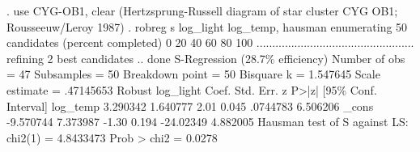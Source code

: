 . use CYG-OB1, clear
(Hertzsprung-Russell diagram of star cluster CYG OB1; Rousseeuw/Leroy 1987)
{\smallskip}
. robreg s log_light log_temp, hausman
{\smallskip}
enumerating 50 candidates (percent completed)
0  20  40  60  80  100
..................................................
{\smallskip}
refining 2 best candidates .. done
{\smallskip}
S-Regression (28.7\% efficiency)                 Number of obs     =         47
                                                  Subsamples      =         50
                                                  Breakdown point =         50
                                                  Bisquare k      =   1.547645
                                                  Scale estimate  =  .47145653
{\smallskip}
             {\VBAR}               Robust
   log_light {\VBAR}      Coef.   Std. Err.      z    P>|z|     [95\% Conf. Interval]
    log_temp {\VBAR}   3.290342   1.640777     2.01   0.045     .0744783    6.506206
       _cons {\VBAR}  -9.570744   7.373987    -1.30   0.194    -24.02349    4.882005
Hausman test of S against LS:    chi2(1) = 4.8433473      Prob > chi2 = 0.0278
{\smallskip}
